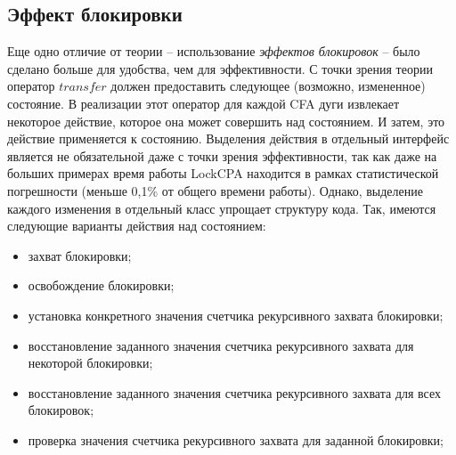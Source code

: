 \subsection{Эффект блокировки}
Еще одно отличие от теории -- использование \textit{эффектов блокировок} -- было сделано больше для удобства, чем для эффективности.
С точки зрения теории оператор $transfer$ должен предоставить следующее (возможно, измененное) состояние.
В реализации этот оператор для каждой CFA дуги извлекает некоторое действие, которое она может совершить над состоянием. 
И затем, это действие применяется к состоянию. 
Выделения действия в отдельный интерфейс является не обязательной даже с точки зрения эффективности, так как даже на больших примерах время работы LockCPA находится в рамках статистической погрешности (меньше 0,1\% от общего времени работы).
Однако, выделение каждого изменения в отдельный класс упрощает структуру кода.
Так, имеются следующие варианты действия над состоянием:
\begin{itemize}
\item захват блокировки;
\item освобождение блокировки;
\item установка конкретного значения счетчика рекурсивного захвата блокировки;
\item восстановление заданного значения счетчика рекурсивного захвата для некоторой блокировки;
\item восстановление заданного значения счетчика рекурсивного захвата для всех блокировок;
\item проверка значения счетчика рекурсивного захвата для заданной блокировки;
\end{itemize}

